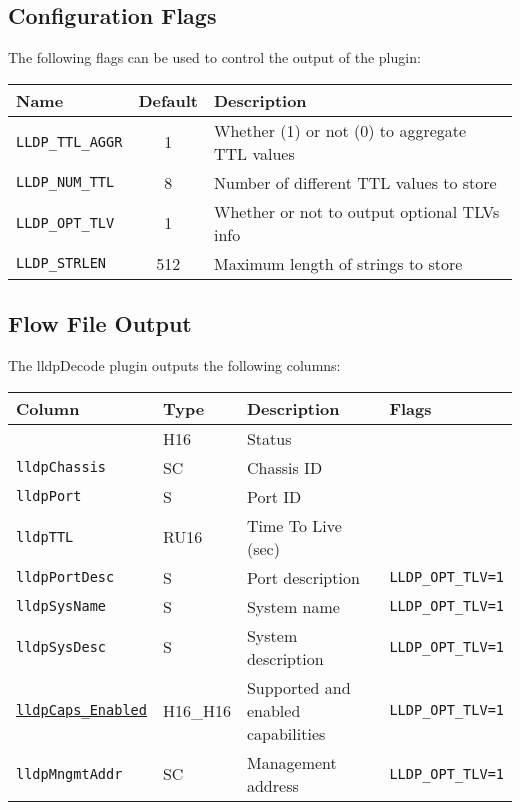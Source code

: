 \documentclass[documentation]{subfiles}
\begin{document}
\subsection{Configuration Flags}
The following flags can be used to control the output of the plugin:
\begin{longtable}{lcl}
    \toprule
    {\bf Name} & {\bf Default} & {\bf Description}\\
    \midrule\endhead%
    {\tt LLDP\_TTL\_AGGR} &   1 & Whether (1) or not (0) to aggregate TTL values\\
    {\tt LLDP\_NUM\_TTL}  &   8 & Number of different TTL values to store\\
    {\tt LLDP\_OPT\_TLV}  &   1 & Whether or not to output optional TLVs info\\
    {\tt LLDP\_STRLEN}    & 512 & Maximum length of strings to store\\
    \bottomrule
\end{longtable}

\subsection{Flow File Output}
The lldpDecode plugin outputs the following columns:
\begin{longtable}{llll}
    \toprule
    {\bf Column} & {\bf Type} & {\bf Description} & {\bf Flags}\\
    \midrule\endhead%
    {\tt \nameref{lldpStat}} & H16 & Status & \\
    {\tt lldpChassis} & SC & Chassis ID\\
    {\tt lldpPort} & S & Port ID\\
    {\tt lldpTTL} & RU16 & Time To Live (sec)\\
    {\tt lldpPortDesc} & S & Port description & {\tt LLDP\_OPT\_TLV=1}\\
    {\tt lldpSysName} & S & System name & {\tt LLDP\_OPT\_TLV=1}\\
    {\tt lldpSysDesc} & S & System description & {\tt LLDP\_OPT\_TLV=1}\\
    {\tt \hyperref[lldpCaps]{lldpCaps\_Enabled}} & H16\_H16 & Supported and enabled capabilities & {\tt LLDP\_OPT\_TLV=1}\\
    {\tt lldpMngmtAddr} & SC & Management address & {\tt LLDP\_OPT\_TLV=1}\\
    \bottomrule
\end{longtable}
\end{document}
